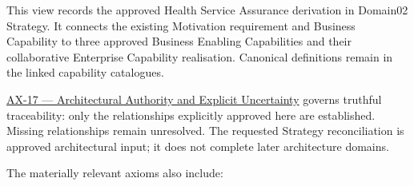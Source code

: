 This view records the approved Health Service Assurance derivation in Domain02 Strategy. It connects the existing Motivation requirement and Business Capability to three approved Business Enabling Capabilities and their collaborative Enterprise Capability realisation. Canonical definitions remain in the linked capability catalogues.

\label{rad:assurance-strategy:16}

\href{https://github.com/fhirfactory/harmonia/blob/98410db60155198a75f74c79d98060070209faa1/docs/markdown/governance/architectural-axioms.md\#ax-17}{AX-17 — Architectural Authority and Explicit Uncertainty} governs truthful traceability: only the relationships explicitly approved here are established. Missing relationships remain unresolved. The requested Strategy reconciliation is approved architectural input; it does not complete later architecture domains.

\label{rad:assurance-strategy:18}

The materially relevant axioms also include:

\label{rad:assurance-strategy:20}

